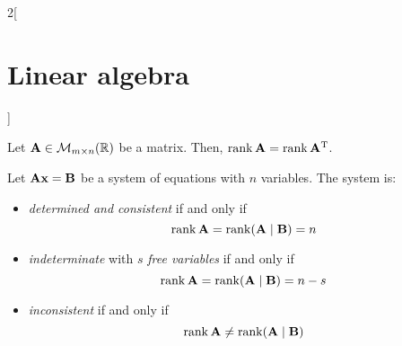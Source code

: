 \documentclass[../../../main.tex]{subfiles}
\begin{document}
\begin{multicols}{2}[\section{Linear algebra}]
  \begin{prop}
    Let $\boldsymbol{\mathrm{A}}\in\mathcal{M}_{m\times n}(\mathbb{R})$ be a matrix. Then, $\rank \boldsymbol{\mathrm{A}}=\rank\vb{A}^{\mathrm{T}}$.
  \end{prop}
  \begin{theorem}
    Let $\boldsymbol{\mathrm{A}}\boldsymbol{\mathrm{x}}=\boldsymbol{\mathrm{B}}$ be a system of equations with $n$ variables. The system is:
    \begin{itemize}
      \item \emph{determined and consistent} if and only if $$\rank \boldsymbol{\mathrm{A}}=\rank (\boldsymbol{\mathrm{A}}\mid \boldsymbol{\mathrm{B}})=n$$
      \item \emph{indeterminate} with $s$ \emph{free variables} if and only if $$\rank \boldsymbol{\mathrm{A}}=\rank (\boldsymbol{\mathrm{A}}\mid \boldsymbol{\mathrm{B}})=n-s$$
      \item \emph{inconsistent} if and only if $$\rank \boldsymbol{\mathrm{A}}\ne\rank (\boldsymbol{\mathrm{A}}\mid \boldsymbol{\mathrm{B}})$$
    \end{itemize}
  \end{theorem}

\end{multicols}
\end{document}
